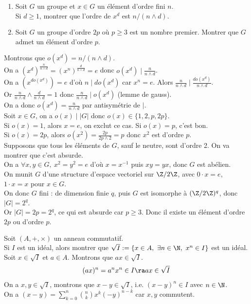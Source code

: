 \documentclass[11pt]{article}
\begin{document}
\begin{exercice}{}{}
    \begin{enumerate}
        \item Soit $G$ un groupe et $x\in G$ un élément d'ordre fini $n$.\\
        Si $d\geq1$, montrer que l'ordre de $x^d$ est $n/(n\land d)$.
        \item Soit $G$ un groupe d'ordre $2p$ où $p\geq3$ est un nombre premier. Montrer que $G$ admet un élément d'ordre $p$.
    \end{enumerate}
    \tcblower
     Montrons que $o(x^d) = n/(n\land d)$.\\
    On a $\left(x^d\right)^{\frac{n}{n\land d}} = (x^n)^{\frac{d}{n\land d}}=e$ donc $o(x^d) \mid \frac{n}{n\land d}$.\\
    On a $(x^{do(x^d)})=e$ d'où $n \mid do(x^d)$ car $x^{n}=e$. Alors $\frac{n}{n\land d}\mid \frac{do(x^d)}{n\land d}$.\\
    Or $\frac{n}{n\land d} \land \frac{d}{n\land d} = 1$ donc $\frac{n}{n\land d}\mid o(x^d)$ (lemme de gauss).\\
    On a donc $o(x^d)=\frac{n}{n\land d}$ par antisymétrie de $\mid$.\\
     Soit $x\in G$, on a $o(x)\mid|G|$ donc $o(x)\in\{1,2,p,2p\}$.\\
    Si $o(x)=1$, alors $x=e$, on exclut ce cas. Si $o(x)=p$, c'est bon.\\
    Si $o(x)=2p$, alors $o(x^2)=\frac{2p}{2p\land 2}=p$ donc $x^2$ est d'ordre $p$.\\
    Supposons que tous les éléments de $G$, sauf le neutre, sont d'ordre 2. On va montrer que c'est absurde.\\
    On a $\forall x,y\in G, ~ x^2=y^2=e$ d'où $x=x^{-1}$ puis $xy=yx$, donc $G$ est abélien.\\
    On munit $G$ d'une structure d'espace vectoriel sur $\Z/2\Z$, avec $0\cdot x = e$, $1\cdot x=x$ pour $x\in G$.\\
    On donc $G$ fini : de dimension finie $q$, puis $G$ est isomorphe à $(\Z/2\Z)^q$, donc $|G|=2^q$.\\
    Or $|G|=2p=2^q$, ce qui est absurde car $p\geq3$. Donc il existe un élément d'ordre $2p$ ou d'ordre $p$.  
\end{exercice}

\vspace*{-0.7cm}

\begin{exercice}{}{}
    Soit $(A,+,\times)$ un anneau commutatif.\\
    Si $I$ est un idéal, alors montrer que $\sqrt{I}:=\{x\in A, ~ \exists n \in \N, ~ x^n \in I\}$ est un idéal.
    \tcblower
    Soit $x \in \sqrt{I}$ et $a\in A$. Montrons que $ax\in\sqrt{I}$.
    \begin{equation*}
        (ax)^n = a^nx^n \in I \ra ax \in \sqrt{I}
    \end{equation*}
    On a $x,y\in\sqrt{I}$, montrons que $x-y\in\sqrt{I}$, i.e. $(x-y)^n\in I$ avec $n\in\N$.\\
    On a $(x-y)=\sum_{k=0}^n\binom{n}{k}x^k(-y)^{n-k}$ car $x,y$ commutent.
\end{exercice}
\end{document}
